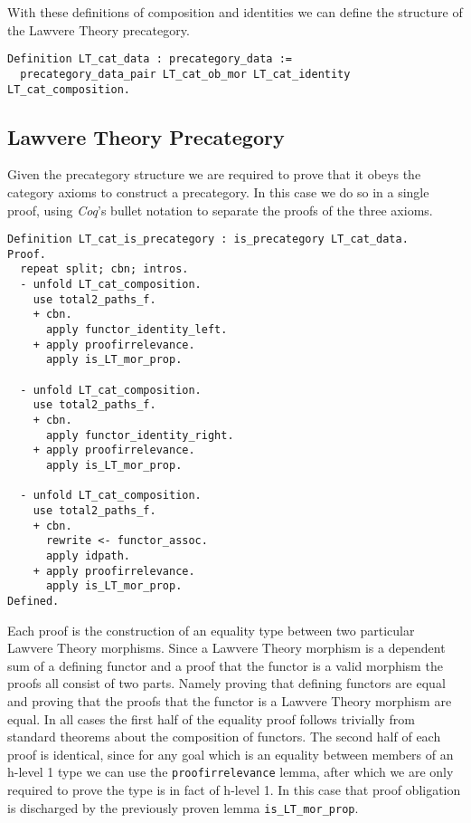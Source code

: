 With these definitions of composition and identities we can define the structure
of the Lawvere Theory precategory.
\begin{lstlisting}
Definition LT_cat_data : precategory_data := 
  precategory_data_pair LT_cat_ob_mor LT_cat_identity LT_cat_composition.
\end{lstlisting}

\subsection{Lawvere Theory Precategory}
Given the precategory structure we are required to prove that it obeys the
category axioms to construct a precategory. In this case we do so in a single
proof, using \textit{Coq}'s bullet notation to separate the proofs of the three
axioms.
\begin{lstlisting}
Definition LT_cat_is_precategory : is_precategory LT_cat_data.
Proof.
  repeat split; cbn; intros.
  - unfold LT_cat_composition.
    use total2_paths_f.
    + cbn.
      apply functor_identity_left.
    + apply proofirrelevance.
      apply is_LT_mor_prop.

  - unfold LT_cat_composition.
    use total2_paths_f.
    + cbn.
      apply functor_identity_right.
    + apply proofirrelevance.
      apply is_LT_mor_prop.

  - unfold LT_cat_composition.
    use total2_paths_f.
    + cbn.
      rewrite <- functor_assoc.
      apply idpath.
    + apply proofirrelevance.
      apply is_LT_mor_prop.
Defined.
\end{lstlisting}

Each proof is the construction of an equality type between two particular
Lawvere Theory morphisms. Since a Lawvere Theory morphism is a dependent sum of
a defining functor and a proof that the functor is a valid morphism the proofs
all consist of two parts. Namely proving that defining functors are equal and
proving that the proofs that the functor is a Lawvere Theory morphism are equal.
In all cases the first half of the equality proof follows trivially from
standard theorems about the composition of functors. The second half of each
proof is identical, since for any goal which is an equality between members of
an h-level 1 type we can use the \lstinline|proofirrelevance| lemma, after which
we are only required to prove the type is in fact of h-level 1. In this case
that proof obligation is discharged by the previously proven lemma
\lstinline|is_LT_mor_prop|.


